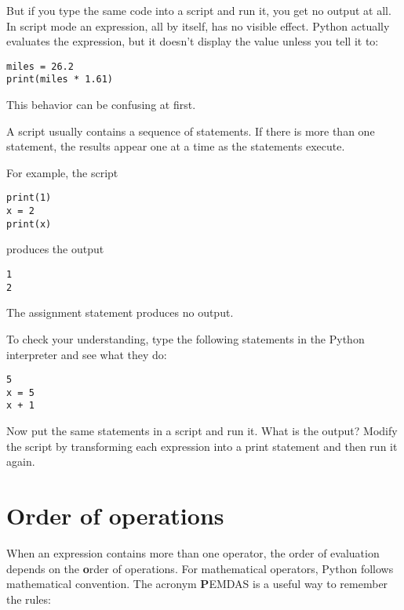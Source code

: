 \documentclass[
DIV=11,
fontsize=13,
twoside,
headinclude=false,
titlepage=firstiscover,
abstract=true,
headsepline=true,
footsepline=true,
chapterprefix=true, %
headings=big,
bibliography=totoc,%
captions=tableheading
]{scrbook}
\theoremstyle{definition}
\begin{document}
But if you type the same code into a script and run it, you get no
output at all.  In script mode an expression, all by itself, has no
visible effect.  Python actually evaluates the expression, but it doesn't
display the value unless you tell it to:

\begin{lstlisting}
miles = 26.2
print(miles * 1.61)
\end{lstlisting}

This behavior can be confusing at first.

A script usually contains a sequence of statements.  If there
is more than one statement, the results appear one at a time
as the statements execute.

For example, the script

\begin{lstlisting}
print(1)
x = 2
print(x)
\end{lstlisting}
%
produces the output

\begin{lstlisting}
1
2
\end{lstlisting}
%
The assignment statement produces no output.

To check your understanding, type the following statements in the
Python interpreter and see what they do:

\begin{lstlisting}
5
x = 5
x + 1
\end{lstlisting}

Now put the same statements in a script and run it.  What
is the output?  Modify the script by transforming each
expression into a print statement and then run it again.



\section{Order of operations}

When an expression contains more than one operator, the order of
evaluation depends on the {\textbf order of operations}.  For
mathematical operators, Python follows mathematical convention.
The acronym {\textbf PEMDAS} is a useful way to
remember the rules:
\end{document}

